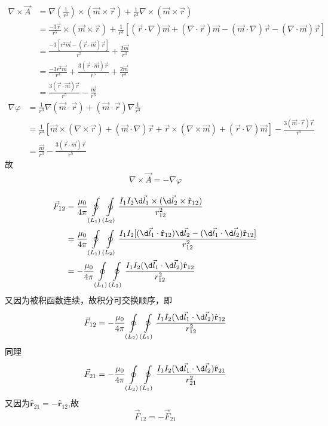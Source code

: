 \documentclass{phyasgn}
\begin{document}
\begin{sol}[2]
  \begin{align*}
    \nabla\times\vec{A}&=\nabla(\frac{1}{r^3})\times(\vec{m}\times\vec{r})+\frac{1}{r^3}\nabla\times(\vec{m}\times\vec{r})\\
    &=\frac{-3\vec{r}}{r^5}\times(\vec{m}\times\vec{r})+\frac{1}{r^3}[(\vec{r}\cdot\nabla)\vec{m}+(\nabla\cdot\vec{r})\vec{m}-(\vec{m}\cdot\nabla)\vec{r}-(\nabla\cdot\vec{m})\vec{r}]\\
    &=\frac{-3[r^2\vec{m}-(\vec{r}\cdot\vec{m})\vec{r}]}{r^5}+\frac{2\vec{m}}{r^3}\\
    &=\frac{-3r^2\vec{m}}{r^3}+\frac{3(\vec{r}\cdot\vec{m})\vec{r}}{r^5}+\frac{2\vec{m}}{r^3}\\
    &=\frac{3(\vec{r}\cdot\vec{m})\vec{r}}{r^5}-\frac{\vec{m}}{r^3}
  \end{align*}
  \begin{align*}
    \nabla\varphi&=\frac{1}{r^3}\nabla(\vec{m}\cdot\vec{r})+(\vec{m}\cdot\vec{r})\nabla\frac{1}{r^3}\\
    &=\frac{1}{r^3}[\vec{m}\times(\nabla\times\vec{r})+(\vec{m}\cdot\nabla)\vec{r}+\vec{r}\times(\nabla\times\vec{m})+(\vec{r}\cdot\nabla)\vec{m}]-\frac{3(\vec{m}\cdot\vec{r})\vec{r}}{r^5}\\
    &=\frac{\vec{m}}{r^3}-\frac{3(\vec{r}\cdot\vec{m})\vec{r}}{r^5}
  \end{align*}  
  故
  \begin{align*}
    \nabla\times\vec{A}=-\nabla\varphi
  \end{align*}
\end{sol}\par

\begin{sol}[4]
  $$\begin{aligned}
        \vec{F}_{12}&=\frac{\mu_0}{4\pi}\oint\limits_{(L_1)}\oint\limits_{(L_2)}\frac{I_1I_2\d \vec{l}_1\times (\d \vec{l}_2\times\hat{\mathbf{r}}_{12})}{r_{12}^2}\\
        &=\frac{\mu_0}{4\pi}\oint\limits_{(L_1)}\oint\limits_{(L_2)}\frac{I_1I_2[(\d \vec{l}_1\cdot \hat{\mathbf{r}}_{12})\d \vec{l}_2-(\d \vec{l}_1\cdot \d \vec{l}_2)\hat{\mathbf{r}}_{12}]}{r_{12}^2}\\
        &=-\frac{\mu_0}{4\pi}\oint\limits_{(L_1)}\oint\limits_{(L_2)}\frac{I_1I_2(\d \vec{l}_1\cdot \d \vec{l}_2)\hat{\mathbf{r}}_{12}}{r_{12}^2}
    \end{aligned}$$
    又因为被积函数连续，故积分可交换顺序，即
    $$\vec{F}_{12}=-\frac{\mu_0}{4\pi}\oint\limits_{(L_2)}\oint\limits_{(L_1)}\frac{I_1I_2(\d \vec{l}_1\cdot \d \vec{l}_2)\hat{\mathbf{r}}_{12}}{r_{12}^2}$$
    同理
    $$\vec{F}_{21}=-\frac{\mu_0}{4\pi}\oint\limits_{(L_2)}\oint\limits_{(L_1)}\frac{I_1I_2(\d \vec{l}_1\cdot \d \vec{l}_2)\hat{\mathbf{r}}_{21}}{r_{21}^2}$$
    又因为$\hat{\mathbf{r}}_{21}=-\hat{\mathbf{r}}_{12}$,故
    $$\vec{F}_{12}=-\vec{F}_{21}$$
\end{sol}\par
\end{document}
